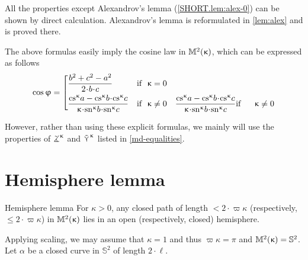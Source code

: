 All the properties except Alexandrov's lemma (\ref{SHORT.lem:alex-0}) can be shown by direct calculation. Alexandrov's lemma is reformulated in \ref{lem:alex} and is proved there.




The above formulas easily imply  the cosine law in $\mathbb{M}_{{}}^{2}({\upkappa})$, which can be expressed as follows
\[\cos\phi
=\left[\begin{aligned}
&\frac{b^2+c^2-a^2}{2\cdot b\cdot c}
&\text{if}&\ \ \kappa=0
\\
&\frac{\cs\kappa a-\cs\kappa b\cdot\cs\kappa c}{\kappa\cdot\sn\kappa b\cdot\sn\kappa c}
&\text{if}&\ \ \kappa\not=0
&\frac{\cs\kappa a-\cs\kappa b\cdot\cs\kappa c}{\kappa\cdot\sn\kappa b\cdot\sn\kappa c}
&\text{if}&\ \ \kappa\not=0
\end{aligned}\right.\]

However, rather than using these explicit formulas,  we mainly will use
the properties of $\tangle\mc\kappa$ and $\mathop{\tilde\curlyvee}\nolimits^{\upkappa}$ listed in \ref{md-equalities}.

\section{Hemisphere lemma}\label{curves-in-model}





\begin{thm}{Hemisphere lemma}
\label{lem:hemisphere}
For $\kappa>0$, any closed path of length $<2\cdot \varpi\kappa$ (respectively, $\le2\cdot \varpi\kappa$) in $\mathbb{M}_{{}}^{2}({\upkappa})$ lies in an open (respectively, closed) hemisphere. 
\end{thm}

 Applying scaling, we may assume that $\kappa=1$ and thus $\varpi\kappa=\pi$ and $\mathbb{M}_{{}}^{2}({\upkappa})=\mathbb{S}^2$.
Let $\alpha$ be a closed curve in $\mathbb{S}^2$ of length $2\cdot\ell$.

